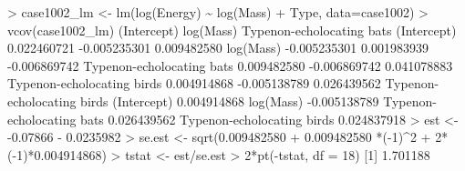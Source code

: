 \documentclass[
]{article}
\newenvironment{Shaded}{\begin{snugshade}}{\end{snugshade}}
\newcommand{\AttributeTok}[1]{\textcolor[rgb]{0.77,0.63,0.00}{#1}}
\newcommand{\DecValTok}[1]{\textcolor[rgb]{0.00,0.00,0.81}{#1}}
\newcommand{\FloatTok}[1]{\textcolor[rgb]{0.00,0.00,0.81}{#1}}
\newcommand{\FunctionTok}[1]{\textcolor[rgb]{0.00,0.00,0.00}{#1}}
\newcommand{\NormalTok}[1]{#1}
\newcommand{\OtherTok}[1]{\textcolor[rgb]{0.56,0.35,0.01}{#1}}
\newcommand{\SpecialCharTok}[1]{\textcolor[rgb]{0.00,0.00,0.00}{#1}}
\begin{document}
\begin{Shaded}
\begin{Highlighting}[]
\SpecialCharTok{\textgreater{}}\NormalTok{ case1002\_lm }\OtherTok{\textless{}{-}} \FunctionTok{lm}\NormalTok{(}\FunctionTok{log}\NormalTok{(Energy) }\SpecialCharTok{\textasciitilde{}} \FunctionTok{log}\NormalTok{(Mass) }\SpecialCharTok{+}\NormalTok{ Type, }\AttributeTok{data=}\NormalTok{case1002)}
\SpecialCharTok{\textgreater{}} \FunctionTok{vcov}\NormalTok{(case1002\_lm)}
\NormalTok{                            (Intercept)    }\FunctionTok{log}\NormalTok{(Mass) Typenon}\SpecialCharTok{{-}}\NormalTok{echolocating bats}
\NormalTok{(Intercept)                 }\FloatTok{0.022460721} \SpecialCharTok{{-}}\FloatTok{0.005235301}               \FloatTok{0.009482580}
\FunctionTok{log}\NormalTok{(Mass)                  }\SpecialCharTok{{-}}\FloatTok{0.005235301}  \FloatTok{0.001983939}              \SpecialCharTok{{-}}\FloatTok{0.006869742}
\NormalTok{Typenon}\SpecialCharTok{{-}}\NormalTok{echolocating bats   }\FloatTok{0.009482580} \SpecialCharTok{{-}}\FloatTok{0.006869742}               \FloatTok{0.041078883}
\NormalTok{Typenon}\SpecialCharTok{{-}}\NormalTok{echolocating birds  }\FloatTok{0.004914868} \SpecialCharTok{{-}}\FloatTok{0.005138789}               \FloatTok{0.026439562}
\NormalTok{                           Typenon}\SpecialCharTok{{-}}\NormalTok{echolocating birds}
\NormalTok{(Intercept)                               }\FloatTok{0.004914868}
\FunctionTok{log}\NormalTok{(Mass)                                }\SpecialCharTok{{-}}\FloatTok{0.005138789}
\NormalTok{Typenon}\SpecialCharTok{{-}}\NormalTok{echolocating bats                 }\FloatTok{0.026439562}
\NormalTok{Typenon}\SpecialCharTok{{-}}\NormalTok{echolocating birds                }\FloatTok{0.024837918}
\SpecialCharTok{\textgreater{}}\NormalTok{ est }\OtherTok{\textless{}{-}}  \SpecialCharTok{{-}}\FloatTok{0.07866} \SpecialCharTok{{-}} \FloatTok{0.0235982}
\SpecialCharTok{\textgreater{}}\NormalTok{ se.est }\OtherTok{\textless{}{-}} \FunctionTok{sqrt}\NormalTok{(}\FloatTok{0.009482580}  \SpecialCharTok{+} \FloatTok{0.009482580} \SpecialCharTok{*}\NormalTok{(}\SpecialCharTok{{-}}\DecValTok{1}\NormalTok{)}\SpecialCharTok{\^{}}\DecValTok{2} \SpecialCharTok{+} \DecValTok{2}\SpecialCharTok{*}\NormalTok{(}\SpecialCharTok{{-}}\DecValTok{1}\NormalTok{)}\SpecialCharTok{*}\FloatTok{0.004914868}\NormalTok{)}
\SpecialCharTok{\textgreater{}}\NormalTok{ tstat }\OtherTok{\textless{}{-}}\NormalTok{ est}\SpecialCharTok{/}\NormalTok{se.est}
\SpecialCharTok{\textgreater{}} \DecValTok{2}\SpecialCharTok{*}\FunctionTok{pt}\NormalTok{(}\SpecialCharTok{{-}}\NormalTok{tstat, }\AttributeTok{df =} \DecValTok{18}\NormalTok{)}
\NormalTok{[}\DecValTok{1}\NormalTok{] }\FloatTok{1.701188}
\end{Highlighting}
\end{Shaded}
\end{document}

